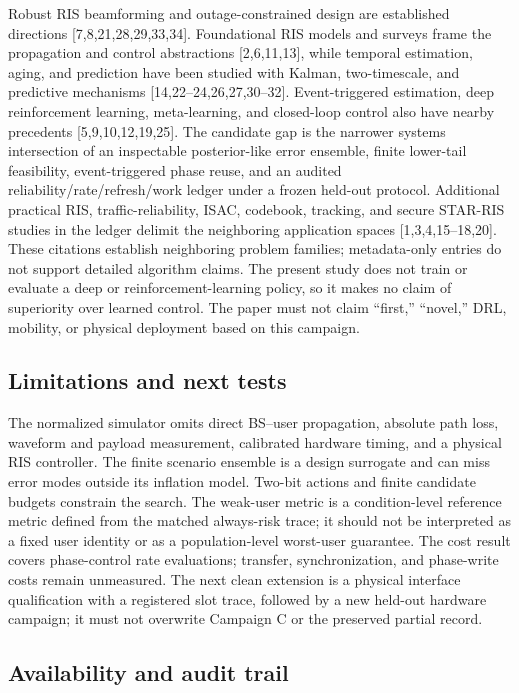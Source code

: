 \documentclass[10pt,twocolumn]{article}
\begin{document}
Robust RIS beamforming and outage-constrained design are established
directions {[}7,8,21,28,29,33,34{]}. Foundational RIS models and surveys
frame the propagation and control abstractions {[}2,6,11,13{]}, while
temporal estimation, aging, and prediction have been studied with
Kalman, two-timescale, and predictive mechanisms
{[}14,22--24,26,27,30--32{]}. Event-triggered estimation, deep
reinforcement learning, meta-learning, and closed-loop control also have
nearby precedents {[}5,9,10,12,19,25{]}. The candidate gap is the
narrower systems intersection of an inspectable posterior-like error
ensemble, finite lower-tail feasibility, event-triggered phase reuse,
and an audited reliability/rate/refresh/work ledger under a frozen
held-out protocol. Additional practical RIS, traffic-reliability, ISAC,
codebook, tracking, and secure STAR-RIS studies in the ledger delimit
the neighboring application spaces {[}1,3,4,15--18,20{]}. These
citations establish neighboring problem families; metadata-only entries
do not support detailed algorithm claims. The present study does not
train or evaluate a deep or reinforcement-learning policy, so it makes
no claim of superiority over learned control. The paper must not claim
``first,'' ``novel,'' DRL, mobility, or physical deployment based on
this campaign.

\subsection{Limitations and next
tests}\label{limitations-and-next-tests}

The normalized simulator omits direct BS--user propagation, absolute
path loss, waveform and payload measurement, calibrated hardware timing,
and a physical RIS controller. The finite scenario ensemble is a design
surrogate and can miss error modes outside its inflation model. Two-bit
actions and finite candidate budgets constrain the search. The weak-user
metric is a condition-level reference metric defined from the matched
always-risk trace; it should not be interpreted as a fixed user identity
or as a population-level worst-user guarantee. The cost result covers
phase-control rate evaluations; transfer, synchronization, and
phase-write costs remain unmeasured. The next clean extension is a
physical interface qualification with a registered slot trace, followed
by a new held-out hardware campaign; it must not overwrite Campaign C or
the preserved partial record.

\subsection{Availability and audit
trail}\label{availability-and-audit-trail}
\end{document}
